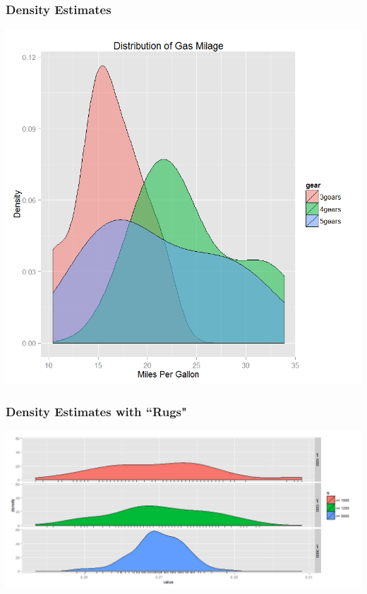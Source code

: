 \documentclass{beamer} %
\begin{document}
\begin{frame}\frametitle{Density Estimates}
	\centering
	\includegraphics[width=0.8\linewidth]{density.png}
\end{frame}





\begin{frame}\frametitle{Density Estimates with ``Rugs"}
	\centering
	\includegraphics[width=\linewidth]{rug.png}
\end{frame}
\end{document}
